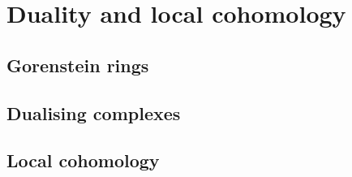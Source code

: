 \chapter{Duality and local cohomology}
    \begin{abstract}
        
    \end{abstract}
    
    \minitoc
    
    \section{Gorenstein rings}
    
    \section{Dualising complexes}
    
    \section{Local cohomology}